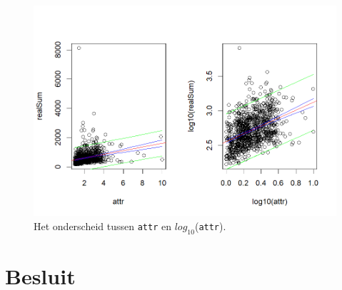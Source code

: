 \documentclass[a4paper]{kulakarticle}
\begin{document}
	\begin{figure}
		\centering
		\includegraphics[width=0.9\linewidth]{Figuren/betr.attr}
		\cprotect\caption{Het onderscheid tussen \verb*|attr| en $log_{10}$(\verb*|attr|).}
		\label{fig:betr}
	\end{figure}


	
	
	
	\section*{Besluit}
	
	
	
	
\end{document}
